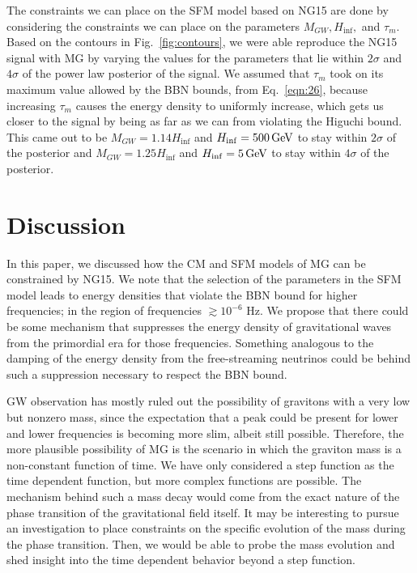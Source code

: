\documentclass[prd,twocolumn,aps,psfig,nofootinbib,nobibnotes,superscriptaddress,preprintnumbers,times]{revtex4-2}
\newcommand{\GeV}{\,{\rm GeV}}
\begin{document}
The constraints we can place on the SFM model based on NG15 are done by considering the constraints we can place on the parameters $M_{GW}, H_{\inf},$ and $\tau_m$. Based on the contours in Fig.\ \ref{fig:contours}, we were able reproduce the NG15 signal with MG by varying the values for the parameters that lie within $2\sigma$ and $4\sigma$ of the power law posterior of the signal. We assumed that $\tau_m$ took on its maximum value allowed by the BBN bounds, from Eq.\ \ref{eqn:26}, because increasing $\tau_m$ causes the energy density to uniformly increase, which gets us closer to the signal by being as far as we can from violating the Higuchi bound. This came out to be $M_{GW} = 1.14H_{\inf}$ and $H_{\inf} = 500 \GeV$ to stay within $2\sigma$ of the posterior and $M_{GW} = 1.25H_{\inf}$ and $H_{\inf} = 5 \GeV$ to stay within $4\sigma$ of the posterior. 


\section{Discussion}\label{sec:discussion}

In this paper, we discussed how the CM and SFM models of MG can be constrained by NG15. We note that the selection of the parameters in the SFM model leads to energy densities that violate the BBN bound for higher frequencies; in the region of frequencies $\gtrsim 10^{-6}$ Hz. We propose that there could be some mechanism that suppresses the energy density of gravitational waves from the primordial era for those frequencies. Something analogous to the damping of the energy density from the free-streaming neutrinos \cite{Weinberg:2004} could be behind such a suppression necessary to respect the BBN bound. 

GW observation has mostly ruled out the possibility of gravitons with a very low but nonzero mass, since the expectation that a peak could be present for lower and lower frequencies is becoming more slim, albeit still possible. Therefore, the more plausible possibility of MG is the scenario in which the graviton mass is a non-constant function of time. We have only considered a step function as the time dependent function, but more complex functions are possible. The mechanism behind such a mass decay would come from the exact nature of the phase transition of the gravitational field itself. It may be interesting to pursue an investigation to place constraints on the specific evolution of the mass during the phase transition. Then, we would be able to probe the mass evolution and shed insight into the time dependent behavior beyond a step function.
\end{document}
